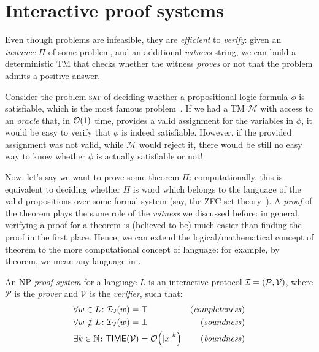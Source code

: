 \section{Interactive proof systems}\label{sec:interactive_proof_systems}
Even though \NPcomplete{} problems are infeasible, they are \emph{efficient} to \emph{verify}: 
given an \emph{instance} \(\Pi \) of some \NPcomplete{} problem, and an additional \emph{witness}
string, we can build a deterministic TM that checks whether the witness \emph{proves} or 
not that the problem admits a positive answer.
\begin{example}
  Consider the problem \textsc{sat} of deciding whether a propositional logic formula \(\phi \) is 
  satisfiable, which is the most famous \NPcomplete{} problem~\cite{Cook1971}. 
  If we had a TM \(\mathcal{M}\) with access to an \emph{oracle} that, in \(\BigO{1}\) time, 
  provides a valid assignment for the variables in \(\phi \), it would be easy to 
  verify that \(\phi \) is indeed satisfiable.
  However, if the provided assignment was not valid, while \(\mathcal{M}\) would reject it, 
  there would be still no easy way to know whether \(\phi \) is actually satisfiable or not! 
\end{example}

Now, let's say we want to prove some theorem \(\Pi \): computationally, this is equivalent to 
deciding whether \(\Pi \) is word which belongs to the language of the valid propositions over some 
formal system (say, the ZFC set theory~\cite{FraenkelHL1973}).
A \emph{proof} of the theorem plays the same role of the \emph{witness} we discussed before: in 
general, verifying a proof for a theorem is (believed to be) much easier than finding the proof in 
the first place.
Hence, we can extend the logical/mathematical concept of theorem to the more computational concept 
of language: for example, by \NPtime{} theorem, we mean any language in \NPtime{}.
\begin{definition}  
  An \textsc{NP} \emph{proof system} for a language \(L\) is an interactive protocol 
  \(\mathcal{I} = \left(\mathcal{P}, \mathcal{V}\right)\), where \(\mathcal{P}\) is the \emph{prover}
  and \(\mathcal{V}\) is the \emph{verifier}, such that:
  \begin{align*}
    & \forall w \in L\colon \call{\mathcal{I}_{\mathcal{V}}}{w} = \top & 
      \textnormal{(\emph{completeness})} \\
    & \forall w \notin L\colon \call{\mathcal{I}_{\mathcal{V}}}{w} = \bot & 
      \textnormal{(\emph{soundness})} \\
    & \exists k \in \mathbb{N}\colon \call{\Time}{\mathcal{V}} = \BigO{\abs{x}^k} & 
    \textnormal{(\emph{boundness})}
  \end{align*}
\end{definition}

